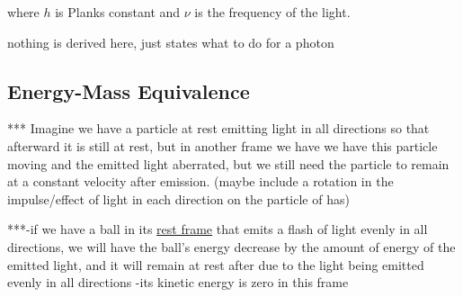 where ${h}$ is Planks constant and ${\nu}$ is the frequency of the light.

nothing is derived here, just states what to do for a photon

\subsection{Energy-Mass Equivalence} \label{subsect: Energy-Mass Equivalence}

*** Imagine we have a particle at rest emitting light in all directions so that afterward it is still at rest, but in another frame we have we have this particle moving and the emitted light aberrated, but we still need the particle to remain at a constant velocity after emission.
(maybe include a rotation in the impulse/effect of light in each direction on the particle of has)

***-if we have a ball in its \hyperlink{def-proper-frame}{rest frame} that emits a flash of light evenly in all directions, we will have the ball's energy decrease by the amount of energy of the emitted light, and it will remain at rest after due to the light being emitted evenly in all directions
-its kinetic energy is zero in this frame


